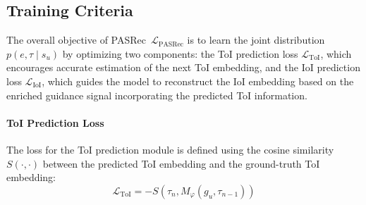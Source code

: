 \documentclass[sigconf,nonacm]{acmart}
\newcommand{\modelname}{PASRec}
\begin{document}
\subsection{Training Criteria}
\label{subsection_training}
The overall objective of \modelname\ \( \mathcal{L}_{\text{\modelname}} \) is to learn the joint distribution \( p(e, \tau \mid {s}_u) \) by optimizing two components: the ToI prediction loss \( \mathcal{L}_{\text{ToI}} \), which encourages accurate estimation of the next ToI embedding, and the IoI prediction loss \( \mathcal{L}_{\text{IoI}} \), which guides the model to reconstruct the IoI embedding based on the enriched guidance signal incorporating the predicted ToI information.

\paragraph{ToI Prediction Loss}
The loss for the ToI prediction module is defined using the cosine similarity \( S(\cdot, \cdot) \) between the predicted ToI embedding and the ground-truth ToI embedding:
\begin{equation}
\label{equation_Ltime}
\mathcal{L}_{\text{ToI}} = -S(\tau_{n},M_\varphi({g}_u, \tau_{n-1}))
\end{equation}
\end{document}
